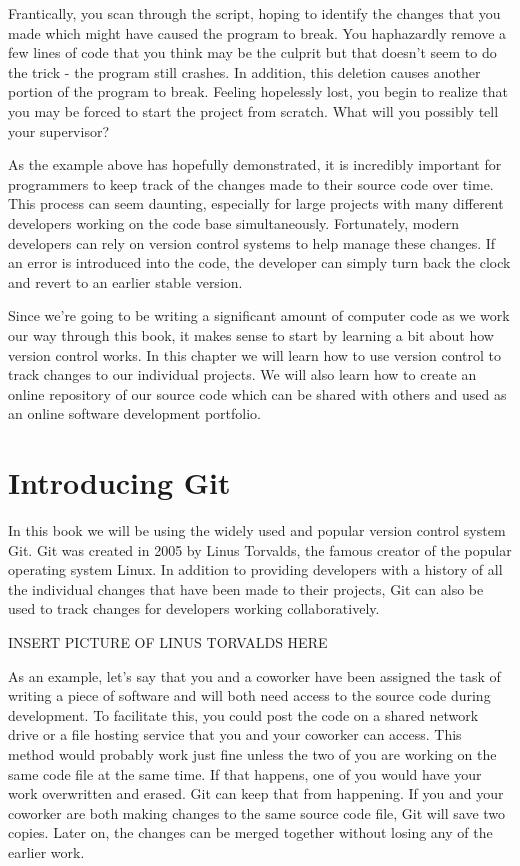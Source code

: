 \documentclass{book}
\begin{document}
Frantically, you scan through the script, hoping to identify the changes that you made which might have caused the program to break. You haphazardly remove a few lines of code that you think may be the culprit but that doesn't seem to do the trick - the program still crashes. In addition, this deletion causes another portion of the program to break. Feeling hopelessly lost, you begin to realize that you may be forced to start the project from scratch. What will you possibly tell your supervisor?

As the example above has hopefully demonstrated, it is incredibly important for programmers to keep track of the changes made to their source code over time. This process can seem daunting, especially for large projects with many different developers working on the code base simultaneously. Fortunately, modern developers can rely on version control systems to help manage these changes. If an error is introduced into the code, the developer can simply turn back the clock and revert to an earlier stable version. 

Since we're going to be writing a significant amount of computer code as we work our way through this book, it makes sense to start by learning a bit about how version control works. In this chapter we will learn how to use version control to track changes to our individual projects. We will also learn how to create an online repository of our source code which can be shared with others and used as an online software development portfolio.

\section{Introducing Git}

In this book we will be using the widely used and popular version control system Git\texttrademark. Git was created in 2005 by Linus Torvalds, the famous creator of the popular operating system Linux. In addition to providing developers with a history of all the individual changes that have been made to their projects, Git can also be used to track changes for developers working collaboratively. 

INSERT PICTURE OF LINUS TORVALDS HERE

As an example, let's say that you and a coworker have been assigned the task of writing a piece of software and will both need access to the source code during development. To facilitate this, you could post the code on a shared network drive or a file hosting service that you and your coworker can access. This method would probably work just fine unless the two of you are working on the same code file at the same time. If that happens, one of you would have your work overwritten and erased. Git can keep that from happening. If you and your coworker are both making changes to the same source code file, Git will save two copies. Later on, the changes can be merged together without losing any of the earlier work. 
\end{document}
